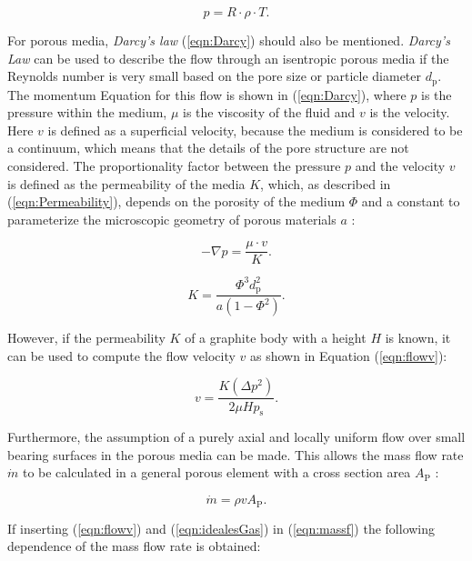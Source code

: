 \begin{equation}
p = R \cdot \rho \cdot T .
\label{eqn:idealesGas}
\end{equation}

For porous media, \textit{Darcy's law} (\ref{eqn:Darcy}) should also be mentioned. \textit{Darcy's Law} can be used to describe the flow through an isentropic porous media if the Reynolds number is very small based on the pore size or particle diameter $d_\text{p}$. The momentum Equation for this flow is shown in (\ref{eqn:Darcy}), where $p$ is the pressure within the medium, $\mu$ is the viscosity of the fluid and $v$ is the velocity. Here $v$ is defined as a superficial velocity, because the medium is considered to be a continuum, which means that the details of the pore structure are not considered. The proportionality factor between the pressure $p$ and the velocity $v$ is defined as the permeability of the media $K$, which, as described in (\ref{eqn:Permeability}), depends on the porosity of the medium $\Phi$ and a constant to parameterize the microscopic geometry of porous materials $a$ \cite{Vafai.2005}:

\begin{equation}
- \nabla p = \frac{\mu \cdot v}{K} .
\label{eqn:Darcy}
\end{equation}


\begin{equation}
K = \frac{\Phi^{3} d_\text{p}^{2}}{a(1- \Phi^{2})} .
\label{eqn:Permeability}
\end{equation}

However, if the permeability $K$ of a graphite body with a height $H$ is known, it can be used to compute the flow velocity $v$ as shown in Equation (\ref{eqn:flowv})\cite{Plante.2005}:

\begin{equation}
v = \frac{K(\Delta p^{2})}{2 \mu Hp_\text{s}} .
\label{eqn:flowv}
\end{equation}

Furthermore, the assumption of a purely axial and locally uniform flow over small bearing surfaces in the porous media can be made. This allows the mass flow rate $ \dot{m} $ to be calculated in a general porous element with a cross section area $A_\text{P}$ \cite{Plante.2005}:

\begin{equation}
\dot{m} = \rho  v A_\text{P} .
\label{eqn:massf}
\end{equation}

If inserting (\ref{eqn:flowv}) and (\ref{eqn:idealesGas}) in (\ref{eqn:massf}) the following dependence of the mass flow rate is obtained:

